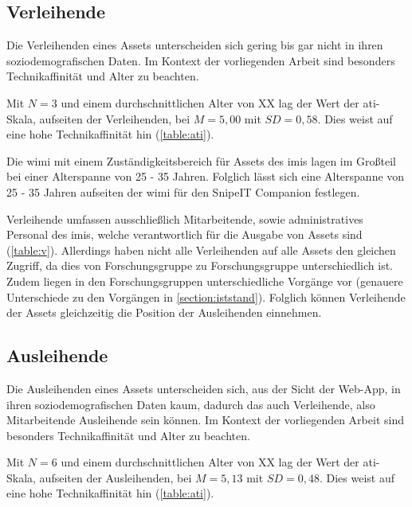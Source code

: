 \subsection{Verleihende}
Die Verleihenden eines Assets unterscheiden sich gering bis gar nicht in ihren
soziodemografischen Daten. Im Kontext der vorliegenden Arbeit sind besonders
Technikaffinität und Alter zu beachten.

Mit $N=3$ und einem durchschnittlichen Alter von XX lag der Wert der
\ac{ati}-Skala, aufseiten der Verleihenden, bei $M=5,00$ mit $SD=0,58$. Dies
weist auf eine hohe Technikaffinität hin (\ref{table:ati}).


Die \ac{wimi} mit einem Zuständigkeitsbereich für Assets des \ac{imis} lagen im
Großteil bei einer Alterspanne von 25 - 35 Jahren. Folglich lässt sich eine
Alterspanne von 25 - 35 Jahren aufseiten der \ac{wimi} für den SnipeIT Companion
festlegen.

Verleihende umfassen ausschließlich Mitarbeitende, sowie administratives
Personal des \ac{imis}, welche verantwortlich für die Ausgabe von Assets sind
(\ref{table:v}). Allerdings haben nicht alle Verleihenden auf alle Assets den
gleichen Zugriff, da dies von Forschungsgruppe zu Forschungsgruppe
unterschiedlich ist. Zudem liegen in den Forschungsgruppen unterschiedliche
Vorgänge vor (genauere Unterschiede zu den Vorgängen in \ref{section:iststand}).
Folglich können Verleihende der Assets gleichzeitig die Position der
Ausleihenden einnehmen.

\subsection{Ausleihende}
Die Ausleihenden eines Assets unterscheiden sich, aus der Sicht der Web-App, in
ihren soziodemografischen Daten kaum,  dadurch das auch
Verleihende, also Mitarbeitende Ausleihende sein können. Im Kontext der
vorliegenden Arbeit sind besonders Technikaffinität und Alter zu beachten.

Mit $N=6$ und einem durchschnittlichen Alter von XX lag der Wert der
\ac{ati}-Skala, aufseiten der Ausleihenden, bei $M=5,13$ mit $SD=0,48$. Dies
weist auf eine hohe Technikaffinität hin (\ref{table:ati}).

